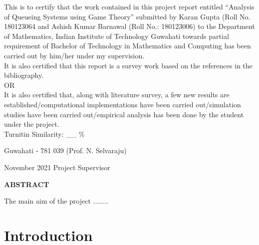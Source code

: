 \documentclass[12pt,a4paper]{report}
\theoremstyle{plain}
\theoremstyle{definition}
\theoremstyle{remark}
\begin{document}
\noindent
This is to certify that the work contained in this project report entitled 
“Analysis of Queueing Systems using Game Theory” submitted by Karan Gupta (Roll No. 180123064 and Ashish Kumar Barnawal (Roll No.: 180123006) 
to the Department of Mathematics, Indian Institute of Technology Guwahati towards partial requirement of
Bachelor of Technology in Mathematics and Computing has been carried out by him/her under
my supervision. \\

\noindent
It is also certified that this report is a survey work based on the references
in the bibliography.\\

OR\\

\noindent
It is also certified that, along with literature survey,
a few new results are established/computational implementations have been carried
out/simulation studies have been carried out/empirical analysis
has been done by the student under the project.\\

\noindent
Turnitin Similarity: \_\_ \%
%

\vspace{4cm}

\noindent Guwahati - 781 039 \hfill (Prof. N. Selvaraju)

\noindent November 2021 \hfill Project Supervisor

\clearpage

\begin{center}
{\Large{\bf{ABSTRACT}}}
\end{center}


The main aim of the project ........

\clearpage



\tableofcontents
\clearpage
\listoffigures
\listoftables


\newpage

\setcounter{page}{1}



\chapter{Introduction}
\end{document}
